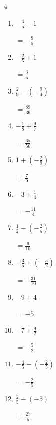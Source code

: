 \begin{multicols}{4}
\begin{enumerate}
  \item $\displaystyle -\frac{4}{5} - 1$

        $\displaystyle =-\frac{9}{5}$

  \item $\displaystyle -\frac{2}{5} + 1$

        $\displaystyle =\frac{3}{5}$

  \item $\displaystyle \frac{2}{9} - \left(-\frac{9}{4}\right)$

        $\displaystyle =\frac{89}{36}$

\columnbreak %

\resetques

  \item $\displaystyle -\frac{1}{8} + \frac{9}{7}$

        $\displaystyle =\frac{65}{56}$

  \item $\displaystyle 1 + \left(-\frac{2}{9}\right)$

        $\displaystyle =\frac{7}{9}$

  \item $\displaystyle -3 + \frac{1}{4}$

        $\displaystyle =-\frac{11}{4}$

  \item $\displaystyle \frac{1}{2} - \left(-\frac{2}{5}\right)$

        $\displaystyle =\frac{9}{10}$

  \item $\displaystyle -\frac{3}{5} + \left(-\frac{5}{2}\right)$

        $\displaystyle =-\frac{31}{10}$

  \item $\displaystyle -9 + 4$

        $\displaystyle =-5$

  \item $\displaystyle -7 + \frac{9}{2}$

        $\displaystyle =-\frac{5}{2}$

  \item $\displaystyle -\frac{4}{5} - \left(-\frac{2}{5}\right)$

        $\displaystyle =-\frac{2}{5}$

  \item $\displaystyle \frac{2}{5} - \left(-5\right)$

        $\displaystyle =\frac{27}{5}$


\end{enumerate}
\end{multicols}
